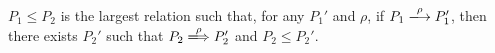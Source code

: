  \begin{myDef}[Subtype]

\(P_1 \le P_2\) is the largest relation such that, for any \(P_1'\)
and \(\rho\), if \(P_1 \xlongrightarrow{\rho} P_1'\), then there
exists \(P_2'\) such that \(P_2 \xLongrightarrow{\rho} P_2'\) and
\(P_2 \le P_2'\).

\label{df:subtype}
\end{myDef}

